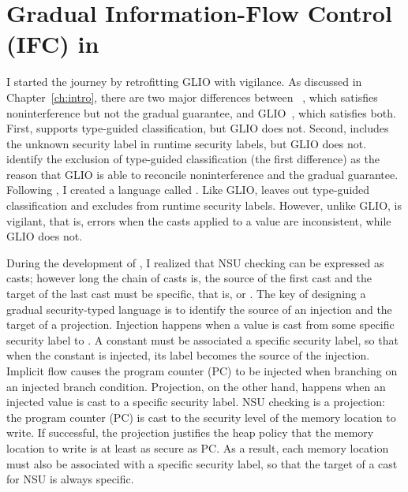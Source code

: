 \chapter{Gradual Information-Flow Control (IFC) in \Surface}
\label{ch:examples}

I started the journey by retrofitting GLIO with vigilance. As discussed in
Chapter~\ref{ch:intro}, there are two major differences between
\GSLRef~\parencite{Toro:2018aa}, which satisfies noninterference but not the
gradual guarantee, and GLIO~\parencite{Amorim:2020aa}, which satisfies both.
First, \GSLRef supports type-guided classification, but GLIO does not. Second,
\GSLRef includes the unknown security label \unk in runtime security labels, but
GLIO does not. \textcite{Amorim:2020aa} identify the exclusion of type-guided
classification (the first difference) as the reason that GLIO is able to
reconcile noninterference and the gradual guarantee. Following
\textcite{Amorim:2020aa}, I created a language called \SurfaceOld. Like GLIO,
\SurfaceOld leaves out type-guided classification and excludes \unk from runtime
security labels. However, unlike GLIO, \SurfaceOld is vigilant, that is,
\Surface errors when the casts applied to a value are inconsistent, while GLIO
does not.

During the development of \SurfaceOld, I realized that NSU checking can be
expressed as casts; however long the chain of casts is, the source of the first
cast and the target of the last cast must be specific, that is, \low or \high.
The key of designing a gradual security-typed language is to identify the source
of an injection and the target of a projection. Injection happens when a value
is cast from some specific security label to \unk. A constant must be associated
a specific security label, so that when the constant is injected, its label
becomes the source of the injection. Implicit flow causes the program counter
(PC) to be injected when branching on an injected branch condition. Projection,
on the other hand, happens when an injected value is cast to a specific security
label. NSU checking is a projection: the program counter (PC) is cast to the
security level of the memory location to write. If successful, the projection
justifies the heap policy that the memory location to write is at least as
secure as PC. As a result, each memory location must also be associated with a
specific security label, so that the target of a cast for NSU is always
specific.

